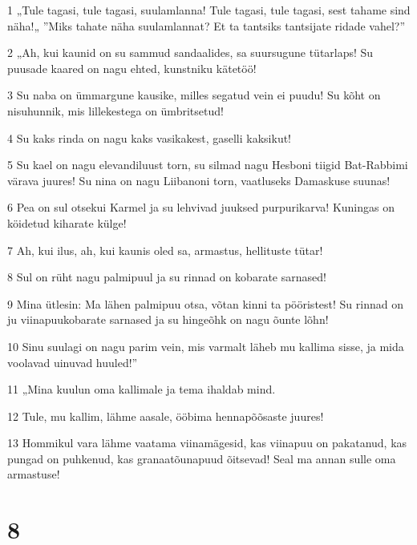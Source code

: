 \par 1 „Tule tagasi, tule tagasi, suulamlanna! Tule tagasi, tule tagasi, sest tahame sind näha!„ ”Miks tahate näha suulamlannat? Et ta tantsiks tantsijate ridade vahel?”
\par 2 „Ah, kui kaunid on su sammud sandaalides, sa suursugune tütarlaps! Su puusade kaared on nagu ehted, kunstniku kätetöö!
\par 3 Su naba on ümmargune kausike, milles segatud vein ei puudu! Su kõht on nisuhunnik, mis lillekestega on ümbritsetud!
\par 4 Su kaks rinda on nagu kaks vasikakest, gaselli kaksikut!
\par 5 Su kael on nagu elevandiluust torn, su silmad nagu Hesboni tiigid Bat-Rabbimi värava juures! Su nina on nagu Liibanoni torn, vaatluseks Damaskuse suunas!
\par 6 Pea on sul otsekui Karmel ja su lehvivad juuksed purpurikarva! Kuningas on köidetud kiharate külge!
\par 7 Ah, kui ilus, ah, kui kaunis oled sa, armastus, hellituste tütar!
\par 8 Sul on rüht nagu palmipuul ja su rinnad on kobarate sarnased!
\par 9 Mina ütlesin: Ma lähen palmipuu otsa, võtan kinni ta pööristest! Su rinnad on ju viinapuukobarate sarnased ja su hingeõhk on nagu õunte lõhn!
\par 10 Sinu suulagi on nagu parim vein, mis varmalt läheb mu kallima sisse, ja mida voolavad uinuvad huuled!”
\par 11 „Mina kuulun oma kallimale ja tema ihaldab mind.
\par 12 Tule, mu kallim, lähme aasale, ööbima hennapõõsaste juures!
\par 13 Hommikul vara lähme vaatama viinamägesid, kas viinapuu on pakatanud, kas pungad on puhkenud, kas granaatõunapuud õitsevad! Seal ma annan sulle oma armastuse!

\chapter{8}

